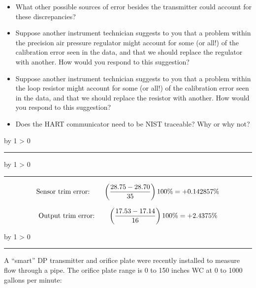 \documentclass[12pt,a4paper]{article}
\def\oppgave{
            \advance\questnum by 1
            \ifnum \questnum > 0
                 \hrule
                 \vskip 3pt
                 \leftline{Oppgave \the\questnum}
                 \vskip 3pt \fi}
\def\svar{
           \advance\answnum by 1
           \ifnum \answnum > 0
                \hrule
                \vskip 3pt
                \leftline{Svar \the\answnum}
                \vskip 3pt \fi}
\def\notes{
           \advance\explnum by 1
           \ifnum \explnum > 0
                \hrule
                \vskip 3pt
                \leftline{Notes \the\explnum}
                \vskip 3pt \fi}
\begin{document}
\begin{itemize}
\item{} What other possible sources of error besides the transmitter could account for these discrepancies?
\item{} Suppose another instrument technician suggests to you that a problem within the precision air pressure regulator might account for some (or all!) of the calibration error seen in the data, and that we should replace the regulator with another.  How would you respond to this suggestion?
\item{} Suppose another instrument technician suggests to you that a problem within the loop resistor might account for some (or all!) of the calibration error seen in the data, and that we should replace the resistor with another.  How would you respond to this suggestion?
\item{} Does the HART communicator need to be NIST traceable?  Why or why not?
\end{itemize}

\vskip 10pt \filbreak 





\svar{} 


\vskip 10pt \filbreak 





\notes{} 

$$\hbox{Sensor trim error:} \hskip 20pt \left({28.75 - 28.70 \over 35}\right) 100\% = +0.142857\%$$

$$\hbox{Output trim error:} \hskip 20pt \left({17.53 - 17.14 \over 16}\right) 100\% = +2.4375\%$$



\vfil \eject 


\oppgave{} 

A ``smart'' DP transmitter and orifice plate were recently installed to measure flow through a pipe.  The orifice plate range is 0 to 150 inches WC at 0 to 1000 gallons per minute:
\end{document}
